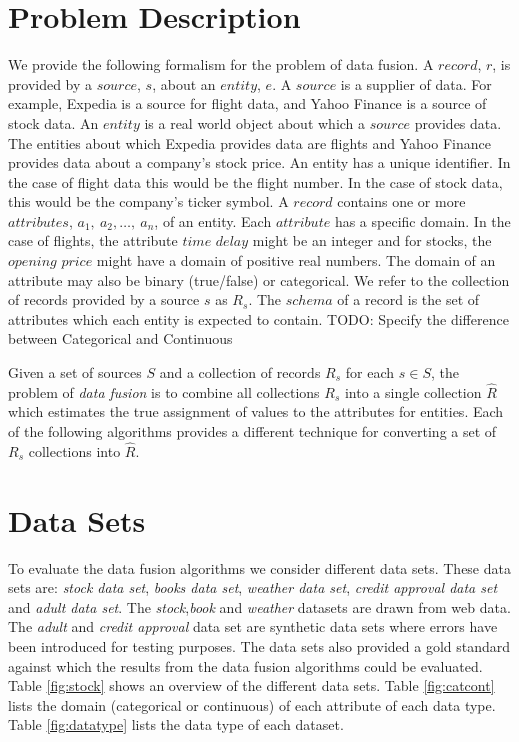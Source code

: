 \documentclass{acm_proc_article-sp}
\begin{document}
\section{Problem Description}

We provide the following formalism for the problem of data fusion. A $record$, $r$, is provided by a $source$, $s$, about an $entity$, $e$. A $source$ is a supplier of data. For example, Expedia is a source for flight data, and Yahoo Finance is a source of stock data.  An $entity$ is a real world object about which a $source$ provides data. The entities about which Expedia provides data are flights and Yahoo Finance provides data about a company's stock price. An entity has a unique identifier. In the case of flight data this would be the flight number. In the case of stock data, this would be the company's ticker symbol. A $record$ contains one or more $attributes$, $a_1,\ a_2,\dots,\ a_n$, of an entity. Each $attribute$ has a specific domain. In the case of flights, the attribute $time$ $delay$ might be an integer and for stocks, the $opening$ $price$ might have a domain of positive real numbers.  The domain of an attribute may also be binary (true/false) or categorical. We refer to the collection of records provided by a source $s$ as $R_s$. The $schema$ of a record is the set of attributes which each entity is expected to contain. TODO: Specify the difference between Categorical and Continuous

Given a set of sources $S$ and a collection of records $R_s$ for each $s \in S$, the problem of \emph{data fusion} is to combine all collections $R_s$ into a single collection $\hat{R}$ which estimates the true assignment of values to the attributes for entities.  Each of the following algorithms provides a different technique for converting a set of $R_s$ collections into $\hat{R}$. 

\section{Data Sets} \label{sec:data_sets}
To evaluate the data fusion algorithms we consider different data sets. These data sets are: \emph{stock data set}, \emph{books data set}, \emph{weather data set}, \emph{credit approval data set} and \emph{adult data set}. The \emph{stock},\emph{book} and \emph{weather} datasets are drawn from web data. The \emph{adult} and \emph{credit approval} data set are synthetic data sets where errors have been introduced for testing purposes. The data sets also provided a gold standard against which the results from the data fusion algorithms could be evaluated. Table \ref{fig:stock} shows an overview of the different data sets. Table \ref{fig:catcont} lists the domain (categorical or continuous) of each attribute of each data type. Table \ref{fig:datatype} lists the data type of each dataset.  \\
\end{document}
